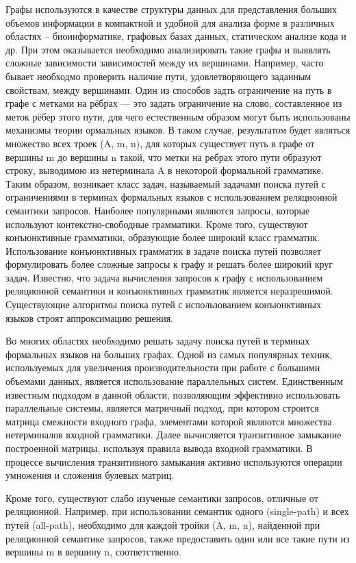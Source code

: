 \documentclass[12pt]{article}  %
\theoremstyle{remark}
\begin{document}
Графы используются в качестве структуры данных для представления больших объемов информации в компактной и удобной для анализа форме в различных областях – биоинформатике, графовых базах данных, статическом анализе кода и др. При этом оказывается необходимо анализировать такие графы и выявлять сложные зависимости зависимостей между их вершинами. Например, часто бывает необходмо проверить наличие пути, удовлетворяющего заданным свойствам, между вершинами. Один из способов задть ограничение на путь в графе с метками на рёбрах --- это задать ограничение на слово, составленное из меток рёбер этого пути, для чего естественным образом могут быть использованы механизмы теории ормальных языков. В таком случае, результатом будет являться множество всех троек (A, m, n), для которых существует путь в графе от вершины m до вершины n такой, что метки на ребрах этого пути образуют строку, выводимою из нетерминала A в некоторой формальной грамматике. Таким образом, возникает класс задач, называемый задачами поиска путей с ограничениями в терминах формальных языков с использованием реляционной семантики запросов. Наиболее популярными являются запросы, которые используют контекстно-свободные грамматики. Кроме того, существуют конъюнктивные грамматики, образующие более широкий класс грамматик. Использование конъюнктивных грамматик в задаче поиска путей позволяет формулировать более сложные запросы к графу и решать более широкий круг задач. Известно, что задача вычисления запросов к графу с использованием реляционной семантики и конъюнктивных грамматик является неразрешимой. Существующие алгоритмы поиска путей с использованием конъюнктивных языков строят аппроксимацию решения.

Во многих областях необходимо решать задачу поиска путей в терминах формальных языков на больших графах. Одной из самых популярных техник, используемых для увеличения производительности при работе с большими объемами данных, является использование параллельных систем. Единственным известным подходом в данной области, позволяющим эффективно использовать параллельные системы, является матричный подход, при котором строится матрица смежности входного графа, элементами которой являются множества нетерминалов входной грамматики. Далее вычисляется транзитивное замыкание построенной матрицы, используя правила вывода входной грамматики. В процессе вычисления транзитивного замыкания активно используются операции умножения и сложения булевых матриц.

Кроме того, существуют слабо изученые семантики запросов, отличные от реляционной. Например, при использовании семантик одного (single-path) и всех путей (all-path), необходимо для каждой тройки (A, m, n), найденной при реляционной семантике запросов, также предоставить один или все такие пути из вершины m в вершину n, соответственно.
\end{document}

